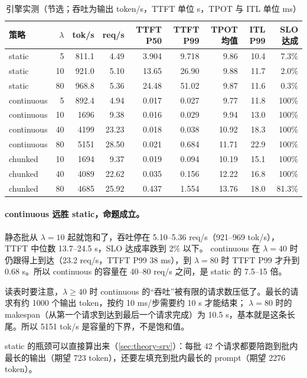 \documentclass[11pt,a4paper]{ctexart}
\begin{document}
\begin{table}[H]\centering\small
\caption{引擎实测（节选；吞吐为输出 token/s，TTFT 单位 s，TPOT 与 ITL 单位 ms）}
\label{tab:engine}
\begin{tabular}{lrrrrrrrr}
\toprule
策略 & $\lambda$ & tok/s & req/s & TTFT P50 & TTFT P99 & TPOT 均值 & ITL P99 & SLO 达成 \\
\midrule
static & 5 & 811.1 & 4.49 & 3.904 & 9.718 & 9.86 & 10.4 & 7.3\% \\
static & 10 & 921.0 & 5.10 & 13.65 & 26.90 & 9.88 & 11.7 & 2.0\% \\
static & 80 & 968.8 & 5.36 & 24.48 & 51.02 & 9.87 & 11.6 & 0.3\% \\
continuous & 5 & 892.4 & 4.94 & 0.017 & 0.027 & 9.77 & 11.8 & 100\% \\
continuous & 10 & 1696 & 9.38 & 0.016 & 0.029 & 9.94 & 13.0 & 100\% \\
continuous & 40 & 4199 & 23.23 & 0.018 & 0.038 & 10.92 & 18.3 & 100\% \\
continuous & 80 & 5151 & 28.50 & 0.021 & 0.684 & 11.71 & 22.9 & 100\% \\
chunked & 10 & 1694 & 9.37 & 0.019 & 0.094 & 10.19 & 15.1 & 100\% \\
chunked & 40 & 4089 & 22.62 & 0.035 & 0.156 & 12.22 & 16.8 & 100\% \\
chunked & 80 & 4685 & 25.92 & 0.437 & 1.554 & 13.76 & 18.0 & 81.3\% \\
\bottomrule
\end{tabular}
\end{table}

\paragraph{continuous 远胜 static，命题成立。} 静态批从 $\lambda=10$ 起就饱和了，吞吐停在 5.10--5.36 req/s（921--969 tok/s），TTFT 中位数 13.7--24.5 s，SLO 达成率跌到 2\% 以下。
continuous 在 $\lambda=40$ 时仍跟得上到达（23.2 req/s，TTFT P99 38 ms），到 $\lambda=80$ 时 TTFT P99 才升到 0.68 s。所以 continuous 的容量在 40--80 req/s 之间，是 static 的 7.5--15 倍。

读表时要注意，$\lambda\ge40$ 时 continuous 的“吞吐”被有限的请求数压低了。最长的请求有约 1000 个输出 token，按约 10 ms/步需要约 10 s 才能结束；
$\lambda=80$ 时的 makespan（从第一个请求到达到最后一个请求完成）为 10.5 s，基本就是这条长尾。所以 5151 tok/s 是容量的下界，不是饱和值。

static 的瓶颈可以直接算出来（\cref{sec:theory-srv}）：每批 42 个请求都要陪跑到批内最长的输出（期望 723 token），还要左填充到批内最长的 prompt（期望 2276 token）。
\end{document}

